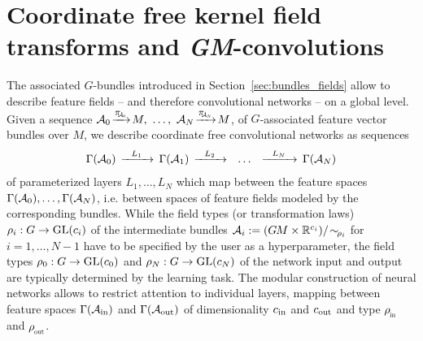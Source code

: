 

\section{Coordinate free kernel field transforms and \textit{GM}-convolutions}
\label{sec:gauge_CNNs_global}


The associated $G$-bundles introduced in Section~\ref{sec:bundles_fields} allow to describe feature fields -- and therefore convolutional networks -- on a global level.
Given a sequence
${\A_0\! \xrightarrow{\scalebox{.85}{$\pi_{{\scalebox{.65}{$\!\!\A_0$}}}$}}\! M ,}\ \dots,\ 
 {\A_N\! \xrightarrow{\scalebox{.85}{$\pi_{{\scalebox{.65}{$\!\!\A_N$}}}$}}\! M}$,
of $G$-associated feature vector bundles over $M$, we describe coordinate free convolutional networks as sequences
\begin{align}
    \Gamma(\mathcal{A}_0)\, \xrightarrow{\ \ L_1\ \ }\, \Gamma(\mathcal{A}_1)\, \xrightarrow{\ \ L_2\ \ }\ \ \dots\ \ \xrightarrow{\ \ L_N\ \ }\, \Gamma(\mathcal{A}_N)
\end{align}
of parameterized layers $L_1,\dots, L_N$ which map between the feature spaces $\Gamma(\mathcal{A}_0), \dots, \Gamma(\mathcal{A}_N)$, i.e. between spaces of feature fields modeled by the corresponding bundles.
While the field types (or transformation laws) ${\rho_i:G\to\operatorname{GL}({c_i})}$ of the intermediate bundles
$\mathcal{A}_i := (G\mkern-1.4muM\times\mathbb{R}^{c_i})/\!\sim_{\!\rho_i}$ for $i=1,\dots,N-1$
have to be specified by the user as a hyperparameter, the field types $\rho_0:G\to\operatorname{GL}({c_0})$ and $\rho_N:G\to\operatorname{GL}({c_N})$ of the network input and output are typically determined by the learning task.
The modular construction of neural networks allows to restrict attention to individual layers, mapping between feature spaces $\Gamma(\mathcal{A}_\textup{in})$ and $\Gamma(\mathcal{A}_\textup{out})$ of dimensionality ${c_\textup{in}}$ and ${c_\textup{out}}$ and type $\rhoin$ and $\rhoout$.


\etocsettocstyle{}{} %
\localtableofcontents


